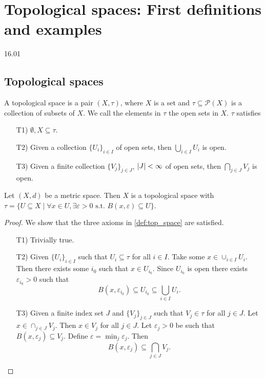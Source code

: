 \section{Topological spaces: First definitions and examples}
16.01

\subsection{Topological spaces}

\begin{definition}
  \label{def:top_space}
  A topological space is a pair \( (X, \tau) \),
  where \( X \) is a set and \( \tau \subseteq \mathcal{P}(X) \)
  is a collection of subsets of \( X \).
  We call the elements in \( \tau \) the open sets in \( X \).
  \( \tau \) satisfies

  \begin{enumerate}
    \item[T1)] \( \emptyset, X \subseteq \tau \).
    \item[T2)] Given a collection \( \{U_i\}_{i \in I} \) of
      open sets, then \( \bigcup_{i\in I} U_i\) is open.
    \item[T3)] Given a finite collection \( \{V_j\}_{j \in J} \), \( \left\lvert{J}\right\rvert < \infty \) of open sets, then \( \bigcap_{j\in J} V_j\) is open.
  \end{enumerate}
\end{definition}

\begin{proposition}
   Let \( (X, d) \) be a metric space. Then \( X \) is a topological space
   with \( \tau = \{ U \subseteq X \mid \forall x \in U, \exists \varepsilon > 0 \text{ s.t. } B(x, \varepsilon) \subseteq U \}  \).
\end{proposition}

\begin{proof} We show that the three axioms in \ref{def:top_space} are satisfied.
   \begin{enumerate}
     \item[T1)] Trivially true.
     \item[T2)] Given \( \{ U_i \}_{i \in I}  \) such that \( U_i \subseteq \tau \) for all \( i \in I \).
       Take some \( x \in \cup_{i\in I} U_i \). Then there exists some \( i_0 \) such that
       \( x \in U_{i_0} \).
       Since \( U_{i_0} \) is open there exists \( \varepsilon_{i_0} > 0 \) such that
      \[
        B(x, \varepsilon_{i_0}) \subseteq U_{i_0} \subseteq \bigcup_{i \in I } U_i.
      \] 
    \item[T3)] Given a finite index set \( J \) and \( \{ V_j  \}_{j \in J}  \) such that \( V_j \in \tau \) for all \( j \in J \).
      Let \( x \in \cap_{j \in J} V_j \). Then \( x \in V_j \) for all \( j \in J \).
      Let \( \varepsilon_j > 0 \) be such that \( B(x, \varepsilon_j) \subseteq V_j \).
      Define \( \varepsilon = \min_j \varepsilon_j \).
      Then
      \[
        B(x, \varepsilon_j) \subseteq \bigcap_{j \in J} V_j.
      \]
   \end{enumerate}
\end{proof}

